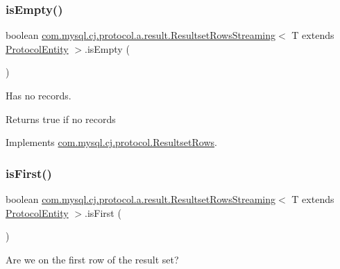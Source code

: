 \subsubsection{\texorpdfstring{is\+Empty()}{isEmpty()}}
{\footnotesize\ttfamily boolean \mbox{\hyperlink{classcom_1_1mysql_1_1cj_1_1protocol_1_1a_1_1result_1_1_resultset_rows_streaming}{com.\+mysql.\+cj.\+protocol.\+a.\+result.\+Resultset\+Rows\+Streaming}}$<$ T extends \mbox{\hyperlink{interfacecom_1_1mysql_1_1cj_1_1protocol_1_1_protocol_entity}{Protocol\+Entity}} $>$.is\+Empty (\begin{DoxyParamCaption}{ }\end{DoxyParamCaption})}

Has no records.

\begin{DoxyReturn}{Returns}
true if no records 
\end{DoxyReturn}


Implements \mbox{\hyperlink{interfacecom_1_1mysql_1_1cj_1_1protocol_1_1_resultset_rows_ae130183c4bba57a93d3fe890f14b6c25}{com.\+mysql.\+cj.\+protocol.\+Resultset\+Rows}}.

\mbox{\label{classcom_1_1mysql_1_1cj_1_1protocol_1_1a_1_1result_1_1_resultset_rows_streaming_a723004a61b6ca61f2da79c7876c62502}} 
\subsubsection{\texorpdfstring{is\+First()}{isFirst()}}
{\footnotesize\ttfamily boolean \mbox{\hyperlink{classcom_1_1mysql_1_1cj_1_1protocol_1_1a_1_1result_1_1_resultset_rows_streaming}{com.\+mysql.\+cj.\+protocol.\+a.\+result.\+Resultset\+Rows\+Streaming}}$<$ T extends \mbox{\hyperlink{interfacecom_1_1mysql_1_1cj_1_1protocol_1_1_protocol_entity}{Protocol\+Entity}} $>$.is\+First (\begin{DoxyParamCaption}{ }\end{DoxyParamCaption})}

Are we on the first row of the result set?

